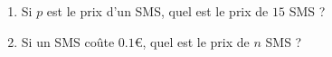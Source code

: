 
\begin{exercice}\label{exosmath-0968}

    \begin{enumerate}
        \item
            Si \( p\) est le prix d'un SMS, quel est le prix de \( 15\) SMS ?
        \item
            Si un SMS coûte \( 0.1\)€, quel est le prix de \( n\) SMS ?
    \end{enumerate}

\end{exercice}
